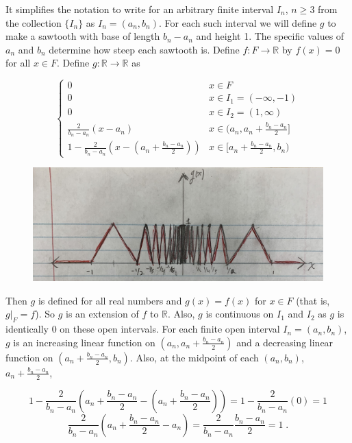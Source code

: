 \documentclass[a4paper]{article}
\begin{document}
It simplifies the notation to write for an arbitrary finite interval $I_n$, $n\geq 3$ from the collection $\{I_n\}$ as $I_n = (a_n,b_n)$. For each such interval we will define $g$ to make a sawtooth with base of length $b_n-a_n$ and height 1. The specific values of $a_n$ and $b_n$ determine how steep each sawtooth is. Define $f:F\rightarrow \mathbb{R}$ by $f(x) = 0$ for all $x \in F$. Define $g: \mathbb{R}\rightarrow \mathbb{R}$ as

$$\begin{cases}
0 & x \in F\\
0 & x \in I_1 = (-\infty, -1)\\
0 & x \in I_2 = (1,\infty)\\
\frac{2}{b_n-a_n}(x-a_n) & x \in (a_n,a_n + \frac{b_n-a_n}{2}]\\
1 - \frac{2}{b_n - a_n}\left(x- (a_n + \frac{b_n-a_n}{2})\right) & x \in [a_n + \frac{b_n - a_n}{2}, b_n)
\end{cases}$$

\begin{figure}[H]
\centering
\includegraphics[width = \linewidth]{function_g.jpg}
\label{$g(x)$}
\end{figure}

Then $g$ is defined for all real numbers and $g(x) = f(x)$ for $x \in F$ (that is, $g\rvert_F = f$). So $g$ is an extension of $f$ to $\mathbb{R}$. Also, $g$ is continuous on $I_1$ and $I_2$ as $g$ is identically 0 on these open intervals. For each finite open interval $I_n = (a_n,b_n)$, $g$ is an increasing linear function on $(a_n, a_n + \frac{b_n-a_n}{2})$ and a decreasing linear function on $(a_n +\frac{b_n-a_n}{2}, b_n)$. Also, at the midpoint of each $(a_n,b_n)$, $a_n + \frac{b_n-a_n}{2}$,

$$1- \frac{2}{b_n-a_n}\left(a_n + \frac{b_n-a_n}{2} - \left(a_n + \frac{b_n-a_n}{2}\right)\right) = 1- \frac{2}{b_n-a_n}(0) = 1$$
$$\frac{2}{b_n-a_n}\left(a_n + \frac{b_n-a_n}{2} - a_n\right) = \frac{2}{b_n-a_n}\frac{b_n-a_n}{2}  = 1 \;.$$
\end{document}
